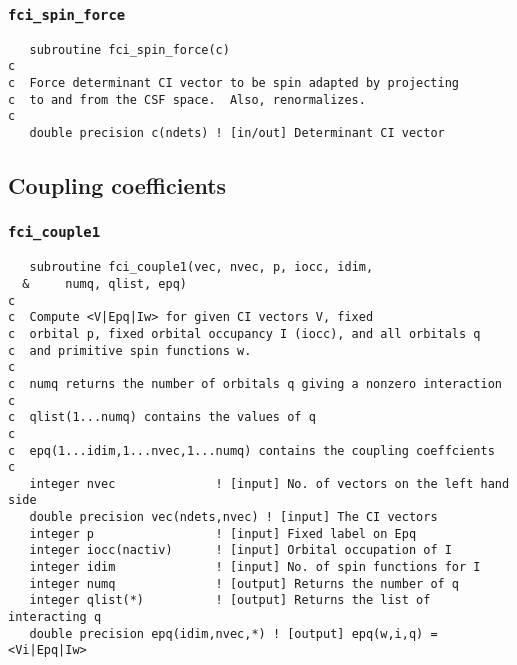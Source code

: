 \documentclass[fullpage,12pt,fleqn]{article}
\begin{document}
\subsubsection{{\tt fci\_spin\_force}}
\begin{verbatim}
   subroutine fci_spin_force(c)
c  
c  Force determinant CI vector to be spin adapted by projecting
c  to and from the CSF space.  Also, renormalizes.
c     
   double precision c(ndets) ! [in/out] Determinant CI vector
\end{verbatim}

\subsection{Coupling coefficients}

\subsubsection{{\tt fci\_couple1}}

\begin{verbatim}
   subroutine fci_couple1(vec, nvec, p, iocc, idim, 
  &     numq, qlist, epq)
c  
c  Compute <V|Epq|Iw> for given CI vectors V, fixed 
c  orbital p, fixed orbital occupancy I (iocc), and all orbitals q
c  and primitive spin functions w.
c  
c  numq returns the number of orbitals q giving a nonzero interaction
c  
c  qlist(1...numq) contains the values of q
c  
c  epq(1...idim,1...nvec,1...numq) contains the coupling coeffcients
c  
   integer nvec              ! [input] No. of vectors on the left hand side
   double precision vec(ndets,nvec) ! [input] The CI vectors
   integer p                 ! [input] Fixed label on Epq
   integer iocc(nactiv)      ! [input] Orbital occupation of I
   integer idim              ! [input] No. of spin functions for I
   integer numq              ! [output] Returns the number of q
   integer qlist(*)          ! [output] Returns the list of interacting q
   double precision epq(idim,nvec,*) ! [output] epq(w,i,q) = <Vi|Epq|Iw>
\end{verbatim}
\end{document}
